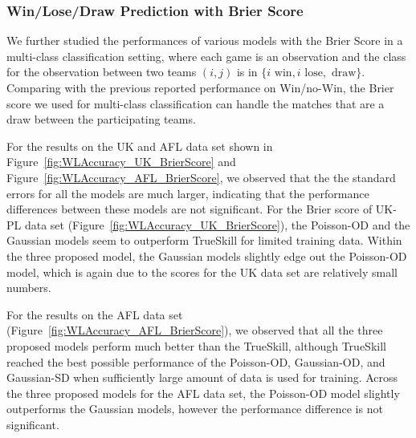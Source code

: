 \subsubsection{Win/Lose/Draw Prediction with Brier Score}
We further studied the performances of various models with the Brier Score in a multi-class classification setting, where each game is an observation and the class for the observation between two teams $(i, j)$ is in $\{i\text{ win}, i\text{ lose}, \text{ draw}\}$. Comparing with the previous reported performance on Win/no-Win, the Brier score we used for multi-class classification can handle the matches that are a draw between the participating teams. 

For the results on the UK and AFL data set shown in Figure~\ref{fig:WLAccuracy_UK_BrierScore} and Figure~\ref{fig:WLAccuracy_AFL_BrierScore}, we observed that the the standard errors for all the models are much larger, indicating that the performance differences between these models are not significant. For the Brier score of UK-PL data set (Figure~\ref{fig:WLAccuracy_UK_BrierScore}), the Poisson-OD and the Gaussian models seem to outperform TrueSkill for limited training data. Within the three proposed model, the Gaussian models slightly edge out the Poisson-OD model, which is again due to the scores for the UK data set are relatively small numbers. 
\begin{center}
\begin{figure*}[t!]
 \centering
\caption{\small Results on the UK data set, evaluated using the Brier Score for multi-class classification. Error bars indicate
standard errors.}
\label{fig:WLAccuracy_UK_BrierScore}
\end{figure*}
\end{center}

For the results on the AFL data set (Figure~\ref{fig:WLAccuracy_AFL_BrierScore}), we observed that all the three proposed models perform much better than the TrueSkill, although TrueSkill reached the best possible performance of the Poisson-OD, Gaussian-OD, and Gaussian-SD when sufficiently large amount of data is used for training. Across the three proposed models for the AFL data set, the Poisson-OD model slightly outperforms the Gaussian models, however the performance difference is not significant. 
\begin{center}
\begin{figure*}[t!]
 \centering
\caption{\small Results on the AFL data set, evaluated using the Brier Score for Win/Lose/Draw prediction. Error bars indicate
standard errors.}
\label{fig:WLAccuracy_AFL_BrierScore}
\end{figure*}
\end{center}


